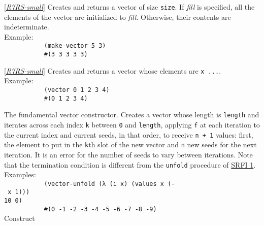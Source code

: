 \begin{description}
\tightlist
\item[ \href{}{(make-vector \emph{size} {[}\emph{fill}{]})
-\textgreater{} vector} ]
{[}\protect\hyperlink{R7RS-small}{\emph{R7RS-small}}{]} Creates and
returns a vector of size \texttt{size}. If \emph{fill} is specified, all
the elements of the vector are initialized to \emph{fill}. Otherwise,
their contents are
indeterminate.\\[2\baselineskip]Example:\\[2\baselineskip]\texttt{\ \ \ \ \ \ \ \ \ \ \ (make-vector\ 5\ 3)\ \ \ \ \ \ \ \ \ }\\
\texttt{\ \ \ \ \ \ \ \ \ \ \ \#(3\ 3\ 3\ 3\ 3)\ \ \ \ \ \ \ \ \ }\\[2\baselineskip]
\item[ \href{}{(vector \emph{x \ldots{}}) -\textgreater{} vector} ]
{[}\protect\hyperlink{R7RS-small}{\emph{R7RS-small}}{]} Creates and
returns a vector whose elements are
\texttt{x\ ...}.\\[2\baselineskip]Example:\\[2\baselineskip]\texttt{\ \ \ \ \ \ \ \ \ \ \ (vector\ 0\ 1\ 2\ 3\ 4)\ \ \ \ \ \ \ \ \ }\\
\texttt{\ \ \ \ \ \ \ \ \ \ \ \#(0\ 1\ 2\ 3\ 4)\ \ \ \ \ \ \ \ \ }\\[2\baselineskip]
\item[ \href{}{(vector-unfold \emph{f length initial-seed \ldots{}})
-\textgreater{} vector} ]
The fundamental vector constructor. Creates a vector whose length is
\texttt{length} and iterates across each index \texttt{k} between
\texttt{0} and \texttt{length}, applying \texttt{f} at each iteration to
the current index and current seeds, in that order, to receive
\texttt{n\ +\ 1} values: first, the element to put in the \texttt{k}th
slot of the new vector and \texttt{n} new seeds for the next iteration.
It is an error for the number of seeds to vary between iterations. Note
that the termination condition is different from the \texttt{unfold}
procedure of \protect\hyperlink{SRFIux5cux25201}{SRFI
1}.\\[2\baselineskip]Examples:\\[2\baselineskip]\texttt{\ \ \ \ \ \ \ \ \ \ \ (vector-unfold\ (λ\ (i\ x)\ (values\ x\ (-\ x\ 1)))\ \ \ \ \ \ \ \ \ \ \ ~~~~~~~~~~\ \ \ \ \ \ \ \ \ \ \ ~~~~~\ \ \ \ \ \ \ \ \ \ \ \ \ \ \ \ \ \ \ \ \ \ \ \ \ \ 10\ 0)\ \ \ \ \ \ \ \ \ }\\
\texttt{\ \ \ \ \ \ \ \ \ \ \ \#(0\ -1\ -2\ -3\ -4\ -5\ -6\ -7\ -8\ -9)\ \ \ \ \ \ \ \ \ }\\[2\baselineskip]Construct

\end{description}

